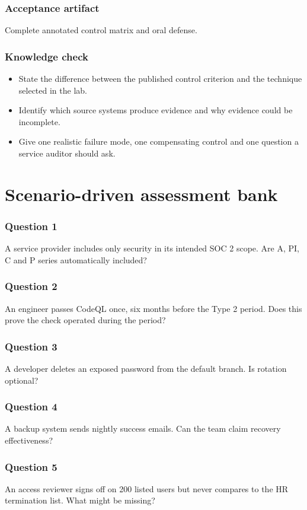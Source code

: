 \documentclass[10pt,oneside]{report}
\begin{document}
\subsection{Acceptance artifact}
Complete annotated control matrix and oral defense.

\subsection{Knowledge check}
\begin{itemize}
\item State the difference between the published control criterion and the technique selected in the lab.
\item Identify which source systems produce evidence and why evidence could be incomplete.
\item Give one realistic failure mode, one compensating control and one question a service auditor should ask.
\end{itemize}

\chapter{Scenario-driven assessment bank}
\subsection*{Question 1}
A service provider includes only security in its intended SOC 2 scope. Are A, PI, C and P series automatically included?

\subsection*{Question 2}
An engineer passes CodeQL once, six months before the Type 2 period. Does this prove the check operated during the period?

\subsection*{Question 3}
A developer deletes an exposed password from the default branch. Is rotation optional?

\subsection*{Question 4}
A backup system sends nightly success emails. Can the team claim recovery effectiveness?

\subsection*{Question 5}
An access reviewer signs off on 200 listed users but never compares to the HR termination list. What might be missing?
\end{document}
